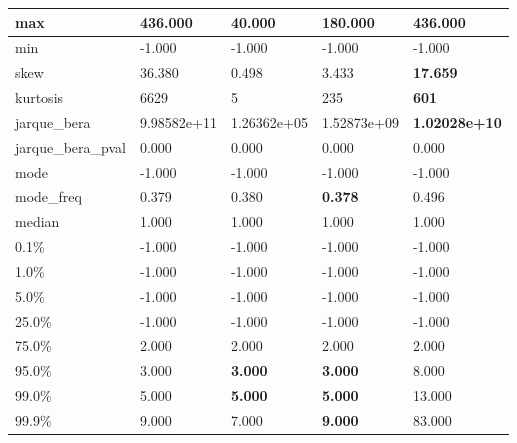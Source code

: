 \begin{table}[H]
\begin{tabular}{|l|m{10em}|m{10em}|m{10em}|m{10em}|}
\hline max & 436.000 & \cellcolor[rgb]{0.9, 0.54, 0.52} 40.000 & 180.000 & \bfseries 436.000 \\
\hline min & -1.000 & -1.000 & -1.000 & -1.000 \\
\hline skew & 36.380 & \cellcolor[rgb]{0.9, 0.54, 0.52} 0.498 & 3.433 & \bfseries 17.659 \\
\hline kurtosis & 6629 & \cellcolor[rgb]{0.9, 0.54, 0.52} 5 & 235 & \bfseries 601 \\
\hline jarque\_bera & 9.98582e+11 & \cellcolor[rgb]{0.9, 0.54, 0.52} 1.26362e+05 & 1.52873e+09 & \bfseries 1.02028e+10 \\
\hline jarque\_bera\_pval & 0.000 & 0.000 & 0.000 & 0.000 \\
\hline mode & -1.000 & -1.000 & -1.000 & -1.000 \\
\hline mode\_freq & 0.379 & 0.380 & \bfseries 0.378 & \cellcolor[rgb]{0.9, 0.54, 0.52} 0.496 \\
\hline median & 1.000 & 1.000 & 1.000 & 1.000 \\
\hline 0.1\% & -1.000 & -1.000 & -1.000 & -1.000 \\
\hline 1.0\% & -1.000 & -1.000 & -1.000 & -1.000 \\
\hline 5.0\% & -1.000 & -1.000 & -1.000 & -1.000 \\
\hline 25.0\% & -1.000 & -1.000 & -1.000 & -1.000 \\
\hline 75.0\% & 2.000 & 2.000 & 2.000 & 2.000 \\
\hline 95.0\% & 3.000 & \bfseries 3.000 & \bfseries 3.000 & \cellcolor[rgb]{0.9, 0.54, 0.52} 8.000 \\
\hline 99.0\% & 5.000 & \bfseries 5.000 & \bfseries 5.000 & \cellcolor[rgb]{0.9, 0.54, 0.52} 13.000 \\
\hline 99.9\% & 9.000 & 7.000 & \bfseries 9.000 & \cellcolor[rgb]{0.9, 0.54, 0.52} 83.000 \\
\hline
\end{tabular}
\end{table}
